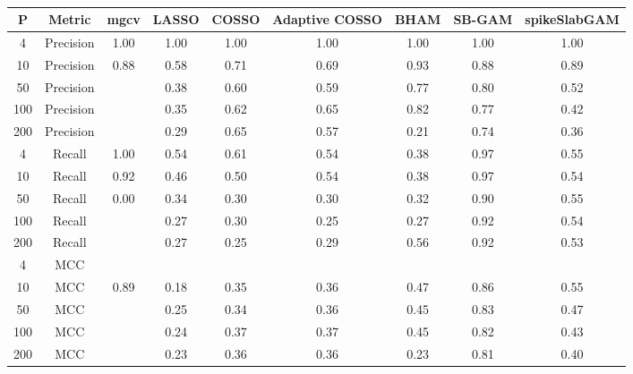 \begin{table}[ht]
\centering
\begin{tabular}{ccccccccc}
  \hline
P & Metric & mgcv & LASSO & COSSO & Adaptive COSSO & BHAM & SB-GAM & spikeSlabGAM \\ 
  \hline
  4 & Precision & 1.00 & 1.00 & 1.00 & 1.00 & 1.00 & 1.00 & 1.00 \\ 
   10 & Precision & 0.88 & 0.58 & 0.71 & 0.69 & 0.93 & 0.88 & 0.89 \\ 
   50 & Precision &  & 0.38 & 0.60 & 0.59 & 0.77 & 0.80 & 0.52 \\ 
  100 & Precision &  & 0.35 & 0.62 & 0.65 & 0.82 & 0.77 & 0.42 \\ 
  200 & Precision &  & 0.29 & 0.65 & 0.57 & 0.21 & 0.74 & 0.36 \\ 
    4 & Recall & 1.00 & 0.54 & 0.61 & 0.54 & 0.38 & 0.97 & 0.55 \\ 
   10 & Recall & 0.92 & 0.46 & 0.50 & 0.54 & 0.38 & 0.97 & 0.54 \\ 
   50 & Recall & 0.00 & 0.34 & 0.30 & 0.30 & 0.32 & 0.90 & 0.55 \\ 
  100 & Recall &  & 0.27 & 0.30 & 0.25 & 0.27 & 0.92 & 0.54 \\ 
  200 & Recall &  & 0.27 & 0.25 & 0.29 & 0.56 & 0.92 & 0.53 \\ 
    4 & MCC &  &  &  &  &  &  &  \\ 
   10 & MCC & 0.89 & 0.18 & 0.35 & 0.36 & 0.47 & 0.86 & 0.55 \\ 
   50 & MCC &  & 0.25 & 0.34 & 0.36 & 0.45 & 0.83 & 0.47 \\ 
  100 & MCC &  & 0.24 & 0.37 & 0.37 & 0.45 & 0.82 & 0.43 \\ 
  200 & MCC &  & 0.23 & 0.36 & 0.36 & 0.23 & 0.81 & 0.40 \\ 
   \hline
\end{tabular}
\caption{} 
\label{}
\end{table}
